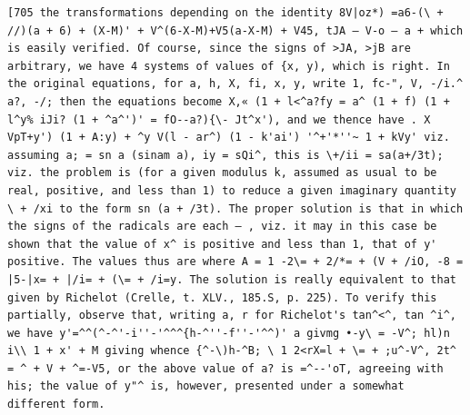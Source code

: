 \documentclass[12pt]{article}
\theoremstyle{plain}
\begin{document}
\newpage
\setcounter{page}{584}
\begin{verbatim}
[705 the transformations depending on the identity 8V|oz*) =a6-(\ + //)(a + 6) + (X-M)' + V^(6-X-M)+V5(a-X-M) + V45, tJA — V-o — a + which is easily verified. Of course, since the signs of >JA, >jB are arbitrary, we have 4 systems of values of {x, y), which is right. In the original equations, for a, h, X, fi, x, y, write 1, fc-", V, -/i.^ a?, -/; then the equations become X,« (1 + l<^a?fy = a^ (1 + f) (1 + l^y% iJi? (1 + ^a^')' = fO--a?){\- Jt^x'), and we thence have . X VpT+y') (1 + A:y) + ^y V(l - ar^) (1 - k'ai') '^+'*''~ 1 + kVy' viz. assuming a; = sn a (sinam a), iy = sQi^, this is \+/ii = sa(a+/3t); viz. the problem is (for a given modulus k, assumed as usual to be real, positive, and less than 1) to reduce a given imaginary quantity \ + /xi to the form sn (a + /3t). The proper solution is that in which the signs of the radicals are each — , viz. it may in this case be shown that the value of x^ is positive and less than 1, that of y' positive. The values thus are where A = 1 -2\= + 2/*= + (V + /iO, -8 = |5-|x= + |/i= + (\= + /i=y. The solution is really equivalent to that given by Richelot (Crelle, t. XLV., 185.S, p. 225). To verify this partially, observe that, writing a, r for Richelot's tan^<^, tan ^i^, we have y'=^^(^-^'-i''-'^^^{h-^''-f''-'^^)' a givmg •-y\ = -V^; hl)n i\\ 1 + x' + M giving whence {^-\)h-^B; \ 1 2<rX=l + \= + ;u^-V^, 2t^ = ^ + V + ^=-V5, or the above value of a? is =^--'oT, agreeing with his; the value of y"^ is, however, presented under a somewhat different form. 
\end{verbatim}
\end{document}
